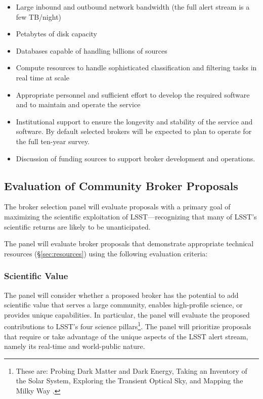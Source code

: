 \begin{itemize}
	\item Large inbound and outbound network bandwidth (the full alert stream is a few TB/night)
	\item Petabytes of disk capacity
	\item Databases capable of handling billions of sources
	\item Compute resources to handle sophisticated classification and filtering tasks in real time at scale
	\item Appropriate personnel and sufficient effort to develop the required software and to maintain and operate the service
	\item Institutional support to ensure the longevity and stability of the service and software.  By default selected brokers will be expected to plan to operate for the full ten-year survey.
	\item Discussion of funding sources to support broker development and operations.
\end{itemize}

\subsection{Evaluation of Community Broker Proposals} \label{sec:evaluation}

The broker selection panel will evaluate proposals with a primary goal of maximizing the scientific exploitation of LSST---recognizing that many of LSST's scientific returns are likely to be unanticipated.

The panel will evaluate broker proposals that demonstrate appropriate technical resources (\S \ref{sec:resources}) using the following evaluation criteria:

\subsubsection{Scientific Value}

The panel will consider whether a proposed broker has the potential to add scientific value that serves a large community, enables high-profile science, or provides unique capabilities.
In particular, the panel will evaluate the proposed contributions to LSST's four science pillars\footnote{These are: Probing Dark Matter and Dark Energy, Taking an Inventory of the Solar System, Exploring the Transient Optical Sky, and Mapping the Milky Way .}.
The panel will prioritize proposals that require or take advantage of the unique aspects of the LSST alert stream, namely its real-time and world-public nature.


